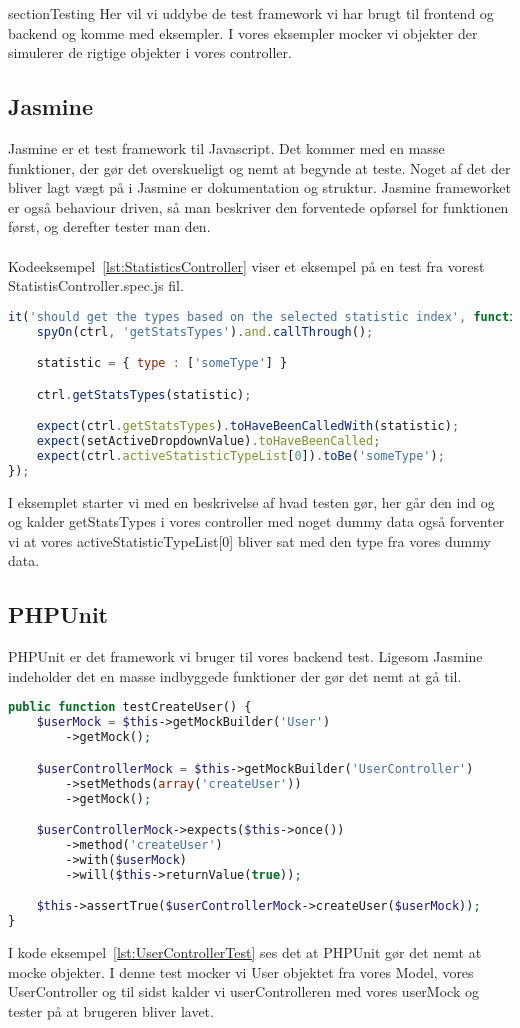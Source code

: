 section{Testing}
Her vil vi uddybe de test framework vi har brugt til frontend og backend og komme
med eksempler. I vores eksempler mocker vi objekter der simulerer de rigtige objekter i vores controller.
\subsection{Jasmine}
Jasmine er et test framework til Javascript. Det kommer med en masse funktioner, 
der gør det overskueligt og nemt at begynde at teste.
Noget af det der bliver lagt vægt på i Jasmine er dokumentation og struktur. Jasmine frameworket er 
også behaviour driven, så man beskriver den forventede opførsel for funktionen først, og derefter tester man den.
\\\\
Kodeeksempel~\ref{lst:StatisticsController} viser et eksempel på en test fra vorest StatistisController.spec.js fil.
\begin{lstlisting}[caption={StatisticsController.spec.js}, language={JavaScript}, label={lst:StatisticsController}]
it('should get the types based on the selected statistic index', function() {
    spyOn(ctrl, 'getStatsTypes').and.callThrough();

    statistic = { type : ['someType'] }

    ctrl.getStatsTypes(statistic);

    expect(ctrl.getStatsTypes).toHaveBeenCalledWith(statistic);
    expect(setActiveDropdownValue).toHaveBeenCalled;
    expect(ctrl.activeStatisticTypeList[0]).toBe('someType');
});
\end{lstlisting}
I eksemplet starter vi med en beskrivelse af hvad testen gør, her går den ind og og kalder getStatsTypes i vores controller
med noget dummy data også forventer vi at vores activeStatisticTypeList[0] bliver sat med den type fra vores dummy data.

\subsection{PHPUnit}
PHPUnit er det framework vi bruger til vores backend test. Ligesom Jasmine indeholder det
en masse indbyggede funktioner der gør det nemt at gå til.
\begin{lstlisting}[caption={UserControllerTest.php}, language={PHP}, label={lst:UserControllerTest}]
public function testCreateUser() {
    $userMock = $this->getMockBuilder('User')
        ->getMock();

    $userControllerMock = $this->getMockBuilder('UserController')
        ->setMethods(array('createUser'))
        ->getMock();

    $userControllerMock->expects($this->once())
        ->method('createUser')
        ->with($userMock)
        ->will($this->returnValue(true));

    $this->assertTrue($userControllerMock->createUser($userMock));
}
\end{lstlisting}
I kode eksempel~\ref{lst:UserControllerTest} ses det at PHPUnit gør det nemt at mocke objekter.
I denne test mocker vi User objektet fra vores Model, vores UserController og til sidst kalder vi userControlleren 
med vores userMock og tester på at brugeren bliver lavet.

